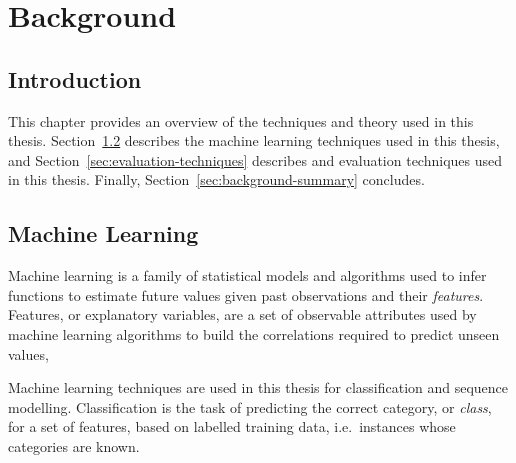 \chapter{Background}
\label{chap:background}

\section{Introduction}

This chapter provides an overview of the techniques and theory used in this thesis. Section~\ref{sec:background-machine-learning} describes the machine learning techniques used in this thesis, and Section~\ref{sec:evaluation-techniques} describes and evaluation techniques used in this thesis. Finally, Section~\ref{sec:background-summary} concludes.


\section{Machine Learning}
\label{sec:background-machine-learning}

Machine learning is a family of statistical models and algorithms used to infer functions to estimate future values given past observations and their \emph{features}. Features, or explanatory variables, are a set of observable attributes used by machine learning algorithms to build the correlations required to predict unseen values, 

Machine learning techniques are used in this thesis for classification and sequence modelling. Classification is the task of predicting the correct category, or \emph{class}, for a set of features, based on labelled training data, i.e.\ instances whose categories are known.

